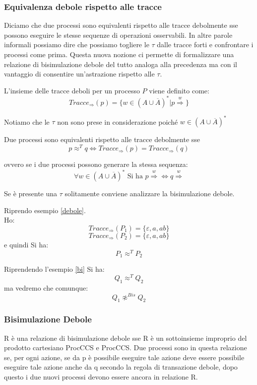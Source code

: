 \subsubsection{Equivalenza debole rispetto alle tracce}
Diciamo che due processi sono equivalenti rispetto alle tracce debolmente sse possono
eseguire le stesse sequenze di operazioni osservabili. In altre parole informali possiamo dire che
possiamo togliere le $\tau$ dalle tracce forti e confrontare i processi come prima. Questa nuova nozione ci permette di formalizzare una relazione di bisimulazione debole del tutto analoga alla precedenza
ma con il vantaggio di consentire un’astrazione rispetto alle $\tau$.
\begin{definizione}
L'insieme delle tracce deboli per un processo $P$ viene definito come:
    \[Tracce_{\Rightarrow}(p)=\{w\in(A\cup \overline{A})^*|
    p\stackrel{w}{\Rightarrow}\}\]
    \begin{nota}
    Notiamo che le $\tau$ non sono prese in considerazione poiché $w\in(A\cup \overline{A})^*$
    \end{nota}
\end{definizione}
\begin{definizione}
Due processi sono equivalenti rispetto alle tracce debolmente sse 
  \[p\approx^T q \iff Tracce_{\Rightarrow}(p)=Tracce_{\Rightarrow}(q)\]
  
 
  ovvero se i due processi possono generare la stessa sequenza:
  \[\forall w\in(A\cup \overline{A})^*\mbox{ Si ha }p\stackrel{w}{\Rightarrow}
    \iff q\stackrel{w}{\Rightarrow}\]
  \begin{nota}
  Se è presente una $\tau$ solitamente conviene analizzare la bisimulazione debole.
  \end{nota}
\end{definizione} \vspace{5mm} %
\begin{esempio}
  Riprendo esempio \ref{debole}.\\
  Ho:
  \[Tracce_{\Rightarrow}(P_1)=\{\varepsilon, a, ab\}\]
  \[Tracce_{\Rightarrow}(P_2)=\{\varepsilon, a, ab\}\]
  e quindi Si ha:
  \[P_1\approx^T P_2\]
\end{esempio}
\begin{esempio}
  Riprendendo l'esempio \ref{bi} Si ha:
  \[Q_1\approx^T Q_2\]
  ma vedremo che comunque:
  \[Q_1\not\approx^{Bis} Q_2\]
\end{esempio}
\subsubsection{Bisimulazione Debole}
R è una relazione di bisimulazione debole sse R è un sottoinsieme improprio del
prodotto cartesiano ProcCCS e ProcCCS. Due processi sono in questa relazione se, per ogni
azione, se da p è possibile eseguire tale azione deve essere possibile eseguire tale azione anche
da q secondo la regola di transazione debole, dopo questo i due nuovi processi devono essere
ancora in relazione R.


